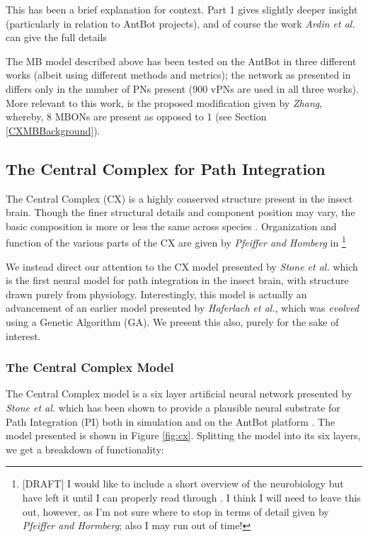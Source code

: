 \documentclass[a4paper,11pt,twoside,openright]{article}
\begin{document}
This has been a brief explanation for context. Part 1 gives slightly deeper
insight\cite{Mitchell2018} (particularly in relation to AntBot projects), and of
course the work \textit{Ardin et al.} can give the full details\cite{Ardin2016}
\newline
\par

The MB model described above has been tested on the AntBot in three different
works (albeit using different methods and metrics); the network as presented in
\cite{Eberding2016, Zhang2017, Mitchell2018} differs only in the number of PNs
present (900 vPNs are used in all three works). More relevant to this work, is
the proposed modification given by \textit{Zhang}, whereby, 8 MBONs are present
as opposed to 1 (see Section \ref{CXMBBackground}).
\newline
\par

\subsection{ The Central Complex for Path Integration } \label{CXBackground}
The Central Complex (CX) is a highly conserved structure present in the insect
brain\cite{Pfeiffer2014, Stone2017}. Though the finer structural details and
component position may vary, the basic composition is more or less the same
across species \cite{Pfeiffer2014}. Organization and function of the
various parts of the CX are given by \textit{Pfeiffer and Homberg} in
\cite{Pfeiffer2014}\footnote{[DRAFT] I would like to include a short overview
  of the neurobiology but have left it until I can properly read through
  \cite{Pfeiffer2014}. I think I will need to leave this out, however, as I'm
  not sure where to stop in terms of detail given by
  \textit{Pfeiffer and Hormberg}; also I may run out of time!
}
\newline
\par

We instead direct our attention to the CX model presented by
\textit{Stone et al.} which is the first neural model for path integration
in the insect brain, with structure drawn purely from physiology. Interestingly,
this model is actually an advancement of an earlier model presented by
\textit{Haferlach et al.}, which was \textit{evolved} using a Genetic Algorithm
(GA). We present this also, purely for the sake of interest.

\subsubsection{The Central Complex Model}
The Central Complex model is a six layer artificial neural network presented by
\textit{Stone et al.} which has been shown to provide a plausible neural
substrate for Path Integration (PI) both in simulation and on the AntBot platform
\cite{Scimeca2017, Stone2017}. The model presented is shown in Figure
\ref{fig:cx}. Splitting the model into its six layers, we get a breakdown of
functionality:
\newline
\par
\end{document}

